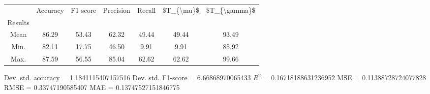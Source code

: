 \begin{tabular}{|c|c|c|c|c|c|c|}
\toprule
{} &  Accuracy &  F1 score &  Precision &  Recall &  \$T\_\{\textbackslash mu\}\$ &  \$T\_\{\textbackslash gamma\}\$ \\
Results &           &           &            &         &            &               \\
\hline
Mean    &     86.29 &     53.43 &      62.32 &   49.44 &      49.44 &         93.49 \\
Min.    &     82.11 &     17.75 &      46.50 &    9.91 &       9.91 &         85.92 \\
Max.    &     87.59 &     56.55 &      85.04 &   62.62 &      62.62 &         99.66 \\
\bottomrule
\end{tabular}

 Dev. std. accuracy = 1.1841115407157516
 Dev. std. F1-score = 6.66868970065433
 $R^2$ = 0.16718188631236952
 MSE = 0.11388728724077828
 RMSE = 0.33747190585407
 MAE = 0.13747527151846775